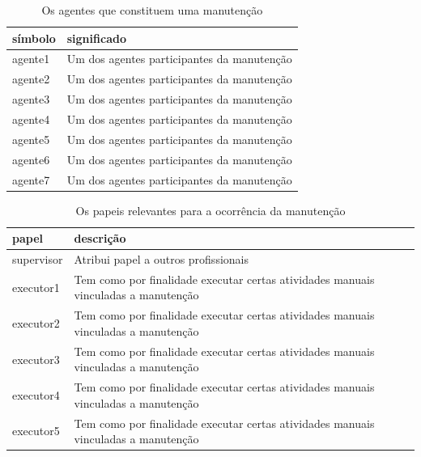 \documentclass[12pt]{article}
\begin{document}
\begin{table}[H]
\centering
\begin{tabular}{|l|l|}
\hline
\textbf{símbolo} & \textbf{significado} \\ \hline
agente1 & Um dos agentes participantes da manutenção \\ \hline
agente2 & Um dos agentes participantes da manutenção \\ \hline
agente3 & Um dos agentes participantes da manutenção \\ \hline
agente4 & Um dos agentes participantes da manutenção \\ \hline
agente5 & Um dos agentes participantes da manutenção \\ \hline
agente6 & Um dos agentes participantes da manutenção \\ \hline
agente7 & Um dos agentes participantes da manutenção \\ \hline
\end{tabular}
\caption{Os agentes que constituem uma manutenção}
\label{agents}
\end{table}


\begin{table}[H]
\centering
\begin{tabular}{|l|l|}
\hline
\textbf{papel} & \textbf{descrição} \\ \hline
supervisor & Atribui papel a outros profissionais \\ \hline
executor1 & Tem como por finalidade executar certas atividades manuais vinculadas a manutenção \\ \hline
executor2 & Tem como por finalidade executar certas atividades manuais vinculadas a manutenção \\ \hline
executor3 & Tem como por finalidade executar certas atividades manuais vinculadas a manutenção \\ \hline
executor4 & Tem como por finalidade executar certas atividades manuais vinculadas a manutenção \\ \hline
executor5 & Tem como por finalidade executar certas atividades manuais vinculadas a manutenção \\ \hline
\end{tabular}
\caption{Os papeis relevantes para a ocorrência da manutenção}
\label{roles}
\end{table}
\end{document}

